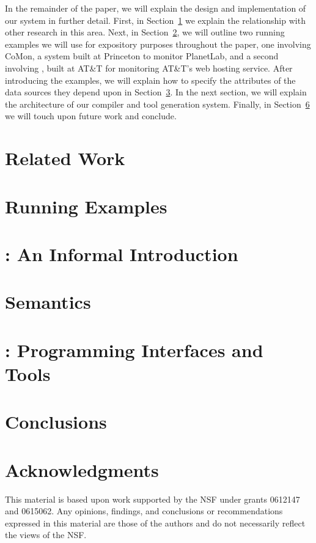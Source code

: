 \documentclass[nocopyrightspace]{sigplanconf}
\begin{document}
In the remainder of the paper, we will explain the design and
implementation of our system in further detail.  First, in Section~\ref{sec:related}
we explain the relationship with other research in this area.  Next, in Section~\ref{sec:examples},
we will outline two running examples we will use for expository purposes throughout the paper, one 
involving CoMon, a system built at Princeton to monitor PlanetLab, and a second involving
\ningaui{}, built at AT\&T for monitoring AT\&T's web hosting service.  After introducing the examples,
we will explain how to specify the attributes of the data sources they depend upon in 
Section~\ref{sec:informal}.  In the next section, we will explain the architecture of our compiler
and tool generation system.  Finally, in Section~\ref{sec:conclusions} we will touch upon future work
and conclude.

\section{Related Work}
\label{sec:related}


\section{Running Examples}
\label{sec:examples}


\section{\padsd{}: An Informal Introduction}
\label{sec:informal}


\section{\padsd{} Semantics}
\label{sec:semantics}


\section{\padsd{}:  Programming Interfaces and Tools}
\label{sec:programming}

\section{Conclusions}
\label{sec:conclusions}

\section*{Acknowledgments}

This material is based upon work 
supported by the NSF
   under grants 0612147 and 0615062.
Any opinions, findings, and conclusions or recommendations
   expressed in this material are those of the authors and do not
   necessarily reflect the views of the NSF.



\end{document}
